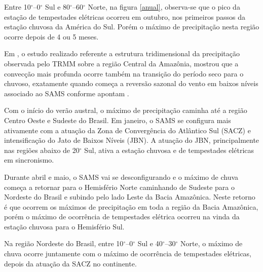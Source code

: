 Entre 10$^{\circ}$--0$^{\circ}$ Sul e 80$^{\circ}$--60$^{\circ}$ Norte,  na figura \ref{anual}, observa-se que o pico da estação de tempestades elétricas ocorreu em outubro, nos primeiros passos da estação chuvosa da América do Sul. Porém o máximo de precipitação nesta região ocorre depois de 4 ou 5 meses. 

Em , o estudo realizado referente a estrutura tridimensional da precipitação observada pelo TRMM sobre a região Central da Amazônia, mostrou que a convecção mais profunda ocorre também na transição do período seco para o chuvoso, exatamente quando começa a reversão sazonal do vento em baixos níveis associado ao SAMS conforme apontam .

Com o início do verão austral, o máximo de precipitação caminha até a região Centro Oeste e Sudeste do Brasil. Em janeiro, o SAMS se configura mais ativamente com a atuação da Zona de Convergência do Atlântico Sul (SACZ)  e intensificação do Jato de Baixos Níveis (JBN).  A atuação do JBN, principalmente nas regiões abaixo de 20$^{\circ}$ Sul, ativa a estação chuvosa e de tempestades elétricas em sincronismo. 

Durante abril e maio, o SAMS vai se desconfigurando e o máximo de chuva começa a retornar para o Hemisfério Norte caminhando de Sudeste para o Nordeste do Brasil e subindo pelo lado Leste da Bacia Amazônica. Neste retorno é que ocorrem os máximos de precipitação em toda a região da Bacia Amazônica, porém o máximo de ocorrência de tempestades elétrica ocorreu na vinda da estação chuvosa para o Hemisfério Sul.

Na região Nordeste do Brasil, entre 10$^{\circ}$--0$^{\circ}$ Sul e 40$^{\circ}$--30$^{\circ}$ Norte, o máximo de chuva ocorre juntamente com o máximo de ocorrência de tempestades elétricas, depois da atuação da SACZ no continente.


